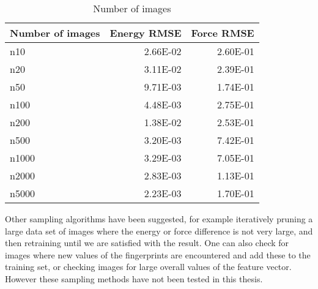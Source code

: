\begin{table}
\begin{tabular}{lrr}
\toprule
Number of images &  Energy RMSE &  Force RMSE \\
\midrule
             n10 &     2.66E-02 &    2.60E-01 \\
             n20 &     3.11E-02 &    2.39E-01 \\
             n50 &     9.71E-03 &    1.74E-01 \\
            n100 &     4.48E-03 &    2.75E-01 \\
            n200 &     1.38E-02 &    2.53E-01 \\
            n500 &     3.20E-03 &    7.42E-01 \\
           n1000 &     3.29E-03 &    7.05E-01 \\
           n2000 &     2.83E-03 &    1.13E-01 \\
           n5000 &     2.23E-03 &    1.70E-01 \\
\bottomrule
\end{tabular}
    \caption{Number of images}
    \label{table:images}
\end{table}

Other sampling algorithms have been suggested, for example iteratively
pruning a large data set of images where the energy or force 
difference is not very large, and then retraining until
we are satisfied with the result.
One can also check for images where new values of the fingerprints
are encountered and add these to the training set, or checking
images for large overall values of the feature vector. However
these sampling methods have not been tested in this thesis.
